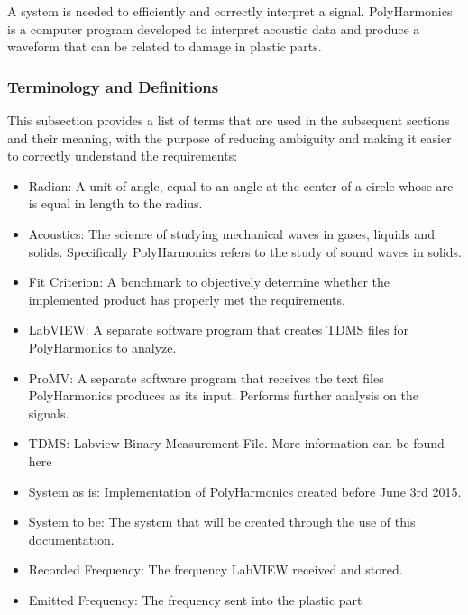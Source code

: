\documentclass[12pt]{article}
\newcommand{\progname}{PolyHarmonics}
\begin{document}
A system is needed to efficiently and correctly interpret a signal. \progname{}
is a computer program developed to interpret acoustic data and produce a
waveform that can be related to damage in plastic parts.


\subsubsection{Terminology and  Definitions}

This subsection provides a list of terms that are used in the subsequent
sections and their meaning, with the purpose of reducing ambiguity and making it
easier to correctly understand the requirements:

\begin{itemize}

\item Radian: A unit of angle, equal to an angle at the center of a circle whose
  arc is equal in length to the radius.
\item Acoustics: The science of studying mechanical waves in gases, liquids and
  solids. Specifically \progname{} refers to the study of sound waves in solids.
\item Fit Criterion: A benchmark to objectively determine whether the
  implemented product has properly met the requirements.
\item LabVIEW: A separate software program that creates TDMS files for 
\progname{} to analyze.
\item ProMV: A separate software program that receives the text files
  \progname{} produces as its input. Performs further analysis on the signals.
\item TDMS: Labview Binary Measurement File. More information can be found here 
\cite{TDMS}\\
\item System as is: Implementation of PolyHarmonics created before June 3rd 
2015.
\item System to be: The system that will be created through the use of this 
documentation.
\item Recorded Frequency: The frequency LabVIEW received and stored.
\item Emitted Frequency: The frequency sent into the plastic part
\end{itemize}
\end{document}
